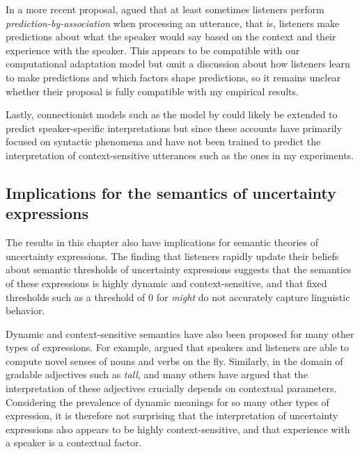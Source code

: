 In a more recent proposal, \textcite{Pickering2013} agued that
at least sometimes listeners perform \textit{prediction-by-association} when processing
an utterance, that is, listeners make predictions about what the speaker would say based on
the context and their experience with the speaker.  This appears to
be compatible with our computational adaptation model but \citeauthor{Pickering2013} omit a discussion
about how listeners learn to make predictions and which factors shape predictions,
so it remains unclear whether their proposal is fully compatible with my empirical results.

Lastly, connectionist models such as the model by \textcite{Chang2006} could likely 
be extended to predict speaker-specific interpretations but since these accounts have primarily
focused on syntactic phenomena and have not been trained to predict the interpretation
of context-sensitive utterances such as the ones in my experiments.

\subsection{Implications for the semantics of uncertainty expressions}

The results in this chapter also have implications for semantic theories of uncertainty expressions.
The finding that listeners rapidly update their beliefs about semantic thresholds of uncertainty expressions
suggests that the semantics of these expressions is highly dynamic and context-sensitive, and that fixed thresholds
such as a threshold of 0 for \textit{might} do not accurately capture linguistic behavior.

Dynamic and context-sensitive semantics have also been proposed for many other types of expressions.
For example, \cite{Clark1983} argued that speakers and listeners
are able to compute novel senses of nouns and verbs on the fly. Similarly, in the domain of gradable adjectives such as \textit{tall},
\cite{Kennedy2007} and many others have argued that the interpretation of these adjectives crucially depends on contextual
parameters. Considering the prevalence of dynamic meanings for so many other types of expression, it is therefore not 
surprising that the interpretation of uncertainty expressions also appears to be highly context-sensitive, and that
experience with a speaker is a contextual factor.
 


